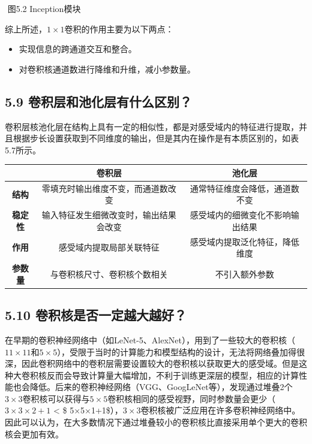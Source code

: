 ​ 图5.2 Inception模块

综上所述，\(1\times 1​\)卷积的作用主要为以下两点：

\begin{itemize}
\tightlist
\item
  实现信息的跨通道交互和整合。
\item
  对卷积核通道数进行降维和升维，减小参数量。
\end{itemize}

\subsection{5.9
卷积层和池化层有什么区别？}\label{ux5377ux79efux5c42ux548cux6c60ux5316ux5c42ux6709ux4ec0ux4e48ux533aux522b}

​
卷积层核池化层在结构上具有一定的相似性，都是对感受域内的特征进行提取，并且根据步长设置获取到不同维度的输出，但是其内在操作是有本质区别的，如表5.7所示。

\begin{longtable}[]{@{}ccc@{}}
\toprule
& 卷积层 & 池化层\tabularnewline
\midrule
\endhead
\textbf{结构} & 零填充时输出维度不变，而通道数改变 &
通常特征维度会降低，通道数不变\tabularnewline
\textbf{稳定性} & 输入特征发生细微改变时，输出结果会改变 &
感受域内的细微变化不影响输出结果\tabularnewline
\textbf{作用} & 感受域内提取局部关联特征 &
感受域内提取泛化特征，降低维度\tabularnewline
\textbf{参数量} & 与卷积核尺寸、卷积核个数相关 &
不引入额外参数\tabularnewline
\bottomrule
\end{longtable}

\subsection{5.10
卷积核是否一定越大越好？}\label{ux5377ux79efux6838ux662fux5426ux4e00ux5b9aux8d8aux5927ux8d8aux597d}

​
在早期的卷积神经网络中（如LeNet-5、AlexNet），用到了一些较大的卷积核（\(11\times11\)和\(5\times 5\)），受限于当时的计算能力和模型结构的设计，无法将网络叠加得很深，因此卷积网络中的卷积层需要设置较大的卷积核以获取更大的感受域。但是这种大卷积核反而会导致计算量大幅增加，不利于训练更深层的模型，相应的计算性能也会降低。后来的卷积神经网络（VGG、GoogLeNet等），发现通过堆叠2个\(3\times 3\)卷积核可以获得与\(5\times 5\)卷积核相同的感受视野，同时参数量会更少（\(3×3×2+1\)
\textless{} \$
5×5×1+1\$），\(3\times 3\)卷积核被广泛应用在许多卷积神经网络中。因此可以认为，在大多数情况下通过堆叠较小的卷积核比直接采用单个更大的卷积核会更加有效。

